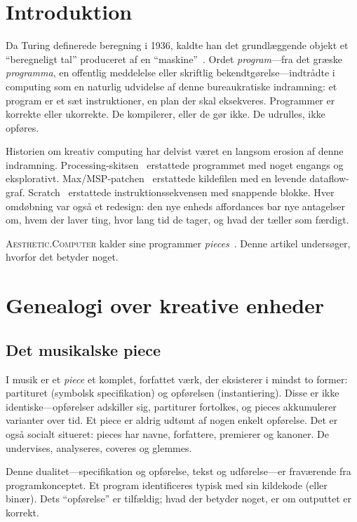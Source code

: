 \documentclass[10pt,letterpaper,twocolumn]{article}
\newcommand{\ac}{\textsc{Aesthetic.Computer}}
\begin{document}
\section{Introduktion}

Da Turing definerede beregning i 1936, kaldte han det grundlæggende objekt et ``beregneligt tal'' produceret af en ``maskine''~\citep{turing1936computable}. Ordet \emph{program}---fra det græske \emph{programma}, en offentlig meddelelse eller skriftlig bekendtgørelse---indtrådte i computing som en naturlig udvidelse af denne bureaukratiske indramning: et program er et sæt instruktioner, en plan der skal eksekveres. Programmer er korrekte eller ukorrekte. De kompilerer, eller de gør ikke. De udrulles, ikke opføres.

Historien om kreativ computing har delvist været en langsom erosion af denne indramning. Processing-skitsen~\citep{reas2007processing} erstattede programmet med noget engangs og eksplorativt. Max/MSP-patchen~\citep{puckette1988patcher} erstattede kildefilen med en levende dataflow-graf. Scratch~\citep{resnick2009scratch} erstattede instruktionssekvensen med snappende blokke. Hver omdøbning var også et redesign: den nye enheds affordances bar nye antagelser om, hvem der laver ting, hvor lang tid de tager, og hvad der tæller som færdigt.

\ac{} kalder sine programmer \emph{pieces}~\citep{scudder2026ac}. Denne artikel undersøger, hvorfor det betyder noget.

\section{Genealogi over kreative enheder}

\subsection{Det musikalske piece}

I musik er et \emph{piece} et komplet, forfattet værk, der eksisterer i mindst to former: partituret (symbolsk specifikation) og opførelsen (instantiering). Disse er ikke identiske---opførelser adskiller sig, partiturer fortolkes, og pieces akkumulerer varianter over tid. Et piece er aldrig udtømt af nogen enkelt opførelse. Det er også socialt situeret: pieces har navne, forfattere, premierer og kanoner. De undervises, analyseres, coveres og glemmes.

Denne dualitet---specifikation og opførelse, tekst og udførelse---er fraværende fra programkonceptet. Et program identificeres typisk med sin kildekode (eller binær). Dets ``opførelse'' er tilfældig; hvad der betyder noget, er om outputtet er korrekt.
\end{document}
